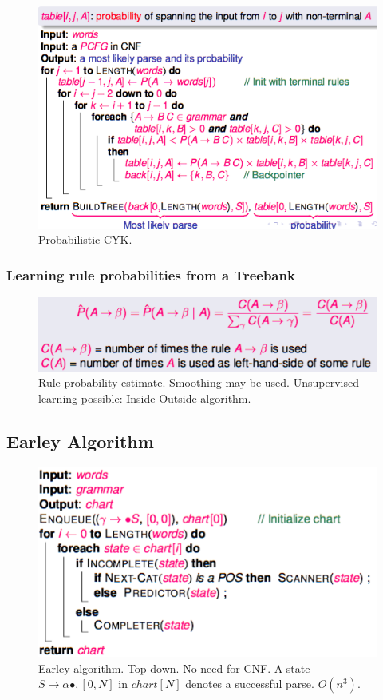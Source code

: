 \begin{figure}[H]
	\centering
	\includegraphics[scale=0.6]{images/55_prob.png}
 	\caption{Probabilistic CYK.}
\end{figure}

\subsubsection{Learning rule probabilities from a Treebank}

\begin{figure}[H]
	\centering
	\includegraphics[scale=0.5]{images/56_learning.png}
 	\caption{Rule probability estimate. Smoothing may be used. Unsupervised learning possible: Inside-Outside algorithm.}
\end{figure}

\subsection{Earley Algorithm}

\begin{figure}[htp]
	\centering
	\includegraphics[scale=0.6]{images/50_earley.png}
 	\caption{Earley algorithm. Top-down. No need for CNF. A state $S \rightarrow \alpha \bullet , [0,N]$ in $chart[N]$ denotes a successful parse. $O(n^3)$. }
\end{figure}

